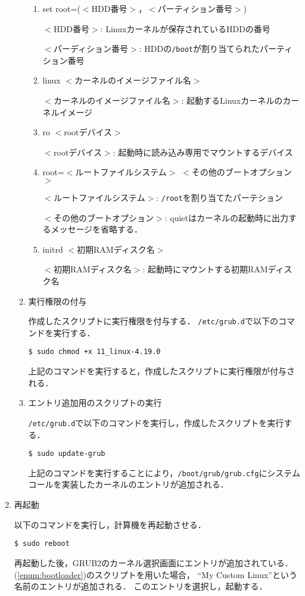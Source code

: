 \documentclass[12pt]{jsarticle}
\begin{document}
\begin{enumerate}
\begin{enumerate}
\begin{enumerate}
\item set root=($<$HDD番号$>$，$<$パーティション番号$>$)

  $<$HDD番号$>$: Linuxカーネルが保存されているHDDの番号
  
  $<$パーディション番号$>$: HDDの\verb|/boot|が割り当てられたパーティション番号
  
\item linux $<$カーネルのイメージファイル名$>$

  $<$カーネルのイメージファイル名$>$: 起動するLinuxカーネルのカーネルイメージ
  
\item ro $<$rootデバイス$>$

  $<$rootデバイス$>$: 起動時に読み込み専用でマウントするデバイス

\item root=$<$ルートファイルシステム$>$ $<$その他のブートオプション$>$

  $<$ルートファイルシステム$>$: \verb|/root|を割り当てたパーテション

  $<$その他のブートオプション$>$: quietはカーネルの起動時に出力するメッセージを省略する．

\item initrd $<$初期RAMディスク名$>$

  $<$初期RAMディスク名$>$: 起動時にマウントする初期RAMディスク名
  
\end{enumerate}

\item 実行権限の付与

  作成したスクリプトに実行権限を付与する．
  \verb|/etc/grub.d|で以下のコマンドを実行する．
\begin{verbatim}
$ sudo chmod +x 11_linux-4.19.0
\end{verbatim}
上記のコマンドを実行すると，作成したスクリプトに実行権限が付与される．

\item エントリ追加用のスクリプトの実行

  \verb|/etc/grub.d|で以下のコマンドを実行し，作成したスクリプトを実行する．
\begin{verbatim}
$ sudo update-grub
\end{verbatim}
  上記のコマンドを実行することにより，\verb|/boot/grub/grub.cfg|にシステムコールを実装したカーネルのエントリが追加される．

\end{enumerate}

\item 再起動

  以下のコマンドを実行し，計算機を再起動させる．
\begin{verbatim}
$ sudo reboot
\end{verbatim}
再起動した後，GRUB2のカーネル選択画面にエントリが追加されている．
(\ref{enum:bootloader})のスクリプトを用いた場合， ``My Custom Linux''という名前のエントリが追加される．
このエントリを選択し，起動する．

\end{enumerate}
\end{document}
